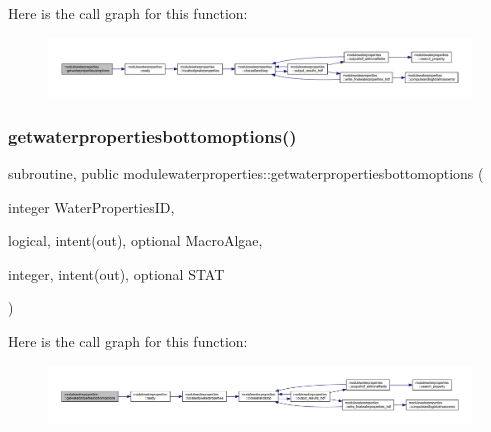 Here is the call graph for this function\+:\nopagebreak
\begin{figure}[H]
\begin{center}
\leavevmode
\includegraphics[width=350pt]{namespacemodulewaterproperties_a01766661cdbaa08fdb84926b54369de4_cgraph}
\end{center}
\end{figure}
\mbox{\label{namespacemodulewaterproperties_a7c3194f050d1f1d1afd1dc2fd3e02dec}} 
\subsubsection{\texorpdfstring{getwaterpropertiesbottomoptions()}{getwaterpropertiesbottomoptions()}}
{\footnotesize\ttfamily subroutine, public modulewaterproperties\+::getwaterpropertiesbottomoptions (\begin{DoxyParamCaption}\item[{integer}]{Water\+Properties\+ID,  }\item[{logical, intent(out), optional}]{Macro\+Algae,  }\item[{integer, intent(out), optional}]{S\+T\+AT }\end{DoxyParamCaption})}

Here is the call graph for this function\+:\nopagebreak
\begin{figure}[H]
\begin{center}
\leavevmode
\includegraphics[width=350pt]{namespacemodulewaterproperties_a7c3194f050d1f1d1afd1dc2fd3e02dec_cgraph}
\end{center}
\end{figure}
\mbox{\label{namespacemodulewaterproperties_a3d2d1a142ceb72d246c0254f29e4595c}} 

